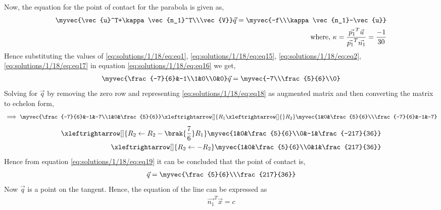 \begin{enumerate}
	Now, the equation for the point of contact for the parabola is given as,
	\begin{align}
		\myvec{\vec{u}^T+\kappa\vec{n_1}^T\\\vec{V}}\vec{q} = \myvec{-f\\\kappa\vec{n_1}-\vec{u}}\label{eq:solutions/1/18/eq:eq16}\\
		\mbox{where, } \kappa = \frac{\vec{p_1}^T\vec{u}}{\vec{p_1}^T\vec{n_1}} = \frac{-1}{30} \label{eq:solutions/1/18/eq:eq17}
	\end{align}
	Hence substituting the values of \eqref{eq:solutions/1/18/eq:eq1}, \eqref{eq:solutions/1/18/eq:eq15}, \eqref{eq:solutions/1/18/eq:eq2}, \eqref{eq:solutions/1/18/eq:eq17} in equation \eqref{eq:solutions/1/18/eq:eq16} we get,
	\begin{align}
		\myvec{\frac{-7}{6}&-1\\1&0\\0&0}\vec{q} = \myvec{-7\\\frac{5}{6}\\0}
		\label{eq:solutions/1/18/eq:eq18}
	\end{align}
	Solving for $\vec{q}$ by removing the zero row and representing \eqref{eq:solutions/1/18/eq:eq18} as augmented matrix and then converting the matrix to echelon form,
	\begin{align}
		\implies \myvec{\frac{-7}{6}&-1&-7\\1&0&\frac{5}{6}} \xleftrightarrow[]{R_1\xleftrightarrow[]{}R_2} \myvec{1&0&\frac{5}{6}\\\frac{-7}{6}&-1&-7}
	\end{align}
	\begin{align}
		\xleftrightarrow[]{R_2\leftarrow R_2-\brak{\frac{7}{6}}R_1} \myvec{1&0&\frac{5}{6}\\0&-1&\frac{-217}{36}} \\
		\xleftrightarrow[]{R_2\leftarrow  -R_2} \myvec{1&0&\frac{5}{6}\\0&1&\frac{217}{36}}
		\label{eq:solutions/1/18/eq:eq19}
	\end{align}
	Hence from equation \eqref{eq:solutions/1/18/eq:eq19} it can be concluded that the point of contact is,
	\begin{align}
		\vec{q} = \myvec{\frac{5}{6}\\\frac{217}{36}}
	\end{align}
	Now $\vec{q}$ is a point on the tangent. Hence, the equation of the
	line can be expressed as
	\begin{align}
		\vec{n_1}^T\vec{x} = c
		\label{eq:solutions/1/18/eq:eq20}

\end{align}
\end{enumerate}
